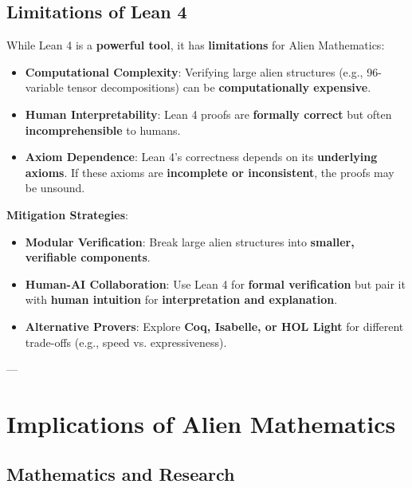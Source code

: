 \documentclass[11pt, a4paper]{article}
\begin{document}
\subsection{Limitations of Lean 4}
While Lean 4 is a \textbf{powerful tool}, it has \textbf{limitations} for Alien Mathematics:
\begin{itemize}
    \item \textbf{Computational Complexity}: Verifying large alien structures (e.g., 96-variable tensor decompositions) can be \textbf{computationally expensive}.
    \item \textbf{Human Interpretability}: Lean 4 proofs are \textbf{formally correct} but often \textbf{incomprehensible} to humans.
    \item \textbf{Axiom Dependence}: Lean 4’s correctness depends on its \textbf{underlying axioms}. If these axioms are \textbf{incomplete or inconsistent}, the proofs may be unsound.
\end{itemize}

\textbf{Mitigation Strategies}:
\begin{itemize}
    \item \textbf{Modular Verification}: Break large alien structures into \textbf{smaller, verifiable components}.
    \item \textbf{Human-AI Collaboration}: Use Lean 4 for \textbf{formal verification} but pair it with \textbf{human intuition} for \textbf{interpretation and explanation}.
    \item \textbf{Alternative Provers}: Explore \textbf{Coq, Isabelle, or HOL Light} for different trade-offs (e.g., speed vs. expressiveness).
\end{itemize}

---

\section{Implications of Alien Mathematics}
\subsection{Mathematics and Research}
\end{document}
